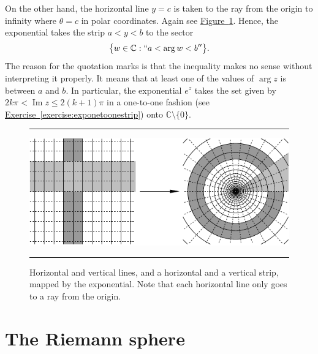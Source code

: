 \documentclass[12pt,openany]{book}
\renewcommand{\Im}{\operatorname{Im}}
\newcommand{\C}{{\mathbb{C}}}
\theoremstyle{plain}
\theoremstyle{remark}
\theoremstyle{definition}
\newenvironment{myfig}{%
\begin{figure}[h!t]
\noindent\rule{\textwidth}{0.5pt}\vspace{12pt}\par\centering}%
{\par\noindent\rule{\textwidth}{0.5pt}
\end{figure}}
\theoremstyle{exercise}
\theoremstyle{example}
\newcommand{\figureref}[1]{\hyperref[#1]{Figure~\ref*{#1}}}
\newcommand{\exerciseref}[1]{\hyperref[#1]{Exercise~\ref*{#1}}}
\begin{document}
On the other hand, the horizontal line $y=c$
is taken to the ray from the origin to infinity where $\theta = c$ in polar
coordinates.  Again see \figureref{fig:expplotlines}.
Hence, the exponential takes the strip $a < y < b$ to the
sector
\begin{equation*}
\bigl\{ w \in \C : ``a < \arg w < b'' \bigr\} .
\end{equation*}
The reason for the quotation marks is that the inequality makes no
sense without interpreting it properly.  It means that at least one of the values
of $\arg z$ is between $a$ and $b$.
In particular, the exponential $e^z$ takes the set given by
$2k\pi < \Im z \leq 2(k+1)\pi$ in a one-to-one fashion
(see \exerciseref{exercise:exponetoonestrip})
onto $\C \setminus \{ 0 \}$.

\begin{myfig}
\includegraphics{figures/expplotlines}
\caption{Horizontal and vertical lines, and a horizontal and a vertical
strip, mapped by the exponential.  Note that
each horizontal line only goes to a ray from the
origin.\label{fig:expplotlines}}
\end{myfig}


\section{The Riemann sphere}
\end{document}
